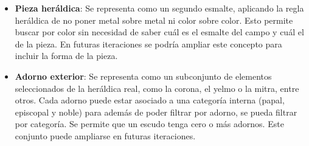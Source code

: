 \begin{itemize}
    \item \textbf{Pieza heráldica}: Se representa como un segundo esmalte, aplicando la regla heráldica
    de no poner metal sobre metal ni color sobre color. Esto permite buscar por color sin necesidad de
    saber cuál es el esmalte del campo y cuál el de la pieza. En futuras iteraciones se podría ampliar
    este concepto para incluir la forma de la pieza.
    \item \textbf{Adorno exterior}: Se representa como un subconjunto de elementos seleccionados de la
    heráldica real, como la corona, el yelmo o la mitra, entre otros. Cada adorno puede estar asociado
    a una categoría interna (papal, episcopal y noble) para además de poder filtrar por adorno, se pueda
    filtrar por categoría. Se permite que un escudo tenga cero o más adornos. Este conjunto puede ampliarse
    en futuras iteraciones.

    \begin{figure}[h!]
    \centering


\end{figure}
\end{itemize}
